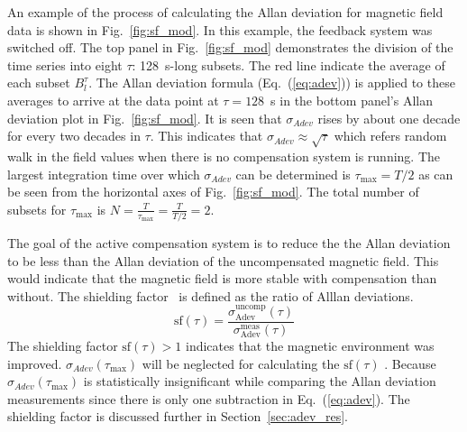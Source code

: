 An example of the process of calculating the Allan deviation for magnetic field data is shown in Fig.~\ref{fig:sf_mod}. In this example, the feedback system was switched off. The top panel in Fig.~\ref{fig:sf_mod} demonstrates the division of the time series into eight $\tau$: 128~s-long subsets. The red line indicate the average of each subset $B_l^{\tau}$. The Allan deviation formula (Eq.~(\ref{eq:adev})) is applied to these averages to arrive at the data point at $\tau=128$~s in the bottom panel's Allan deviation plot in Fig.~\ref{fig:sf_mod}.  It is seen that $\sigma_{Adev}$ rises by about one decade for every two decades in $\tau$. This indicates that $\sigma_{Adev}\approx \sqrt{\tau}$ which refers random walk in the field values when there is no compensation system is running. The largest integration time over which $\sigma_{Adev}$ can be determined is $\tau_{\text{max}}=T/2$ as can be seen from the horizontal axes of Fig.~\ref{fig:sf_mod}. The total number of subsets for $\tau_{\text{max}}$ is $N = \frac{T}{\tau_{\text{max}}}=\frac{T}{T/2}=2$. 






The goal of the active compensation system is to reduce the the Allan deviation to be less than the Allan deviation of the uncompensated magnetic field. This would indicate that the magnetic field is more stable with compensation than without. The shielding factor~\cite{bea} is defined as the ratio of Alllan deviations.
\begin{equation}\label{eq:sf}
    \text{sf} (\tau)=\frac{\sigma_{\text{Adev}}^{\text{uncomp}}(\tau)}{\sigma_{\text{Adev}}^{\text{meas}}(\tau)}
\end{equation}
The shielding factor $\text{sf} (\tau)>1$ indicates that the magnetic environment was improved. $\sigma_{Adev}(\tau_{\text{max}})$ will be neglected for calculating the $\text{sf} (\tau)$ . Because $\sigma_{Adev}(\tau_{\text{max}})$ is statistically insignificant while comparing the Allan deviation measurements since there is only one subtraction in Eq.~(\ref{eq:adev}). The shielding factor is discussed further in Section~\ref{sec:adev_res}.
 

 
 
 
